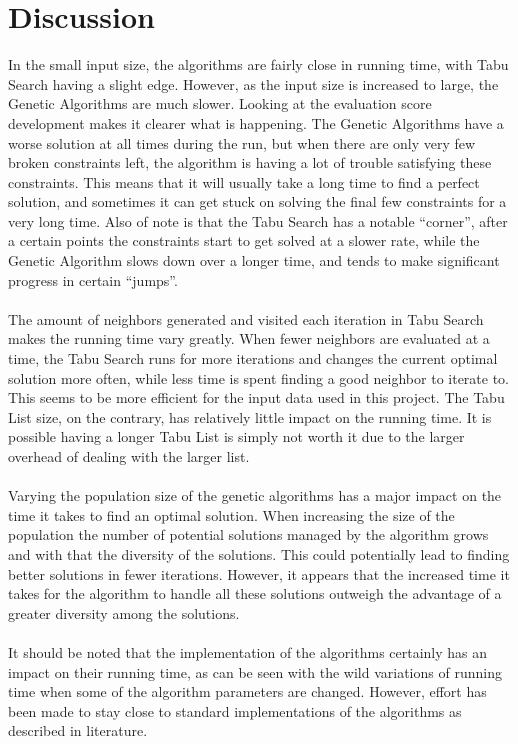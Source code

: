 \documentclass[titlepage,a4paper]{article}
\begin{document}
\pagebreak
\section{Discussion}
In the small input size, the algorithms are fairly close in running time, with Tabu Search having a slight edge. However, as the input size is increased to large, the Genetic Algorithms are much slower. Looking at the evaluation score development makes it clearer what is happening. The Genetic Algorithms have a worse solution at all times during the run, but when there are only very few broken constraints left, the algorithm is having a lot of trouble satisfying these constraints. This means that it will usually take a long time to find a perfect solution, and sometimes it can get stuck on solving the final few constraints for a very long time.
Also of note is that the Tabu Search has a notable “corner”, after a certain points the constraints start to get solved at a slower rate, while the Genetic Algorithm slows down over a longer time, and tends to make significant progress in certain “jumps”. \\\\
The amount of neighbors generated and visited each iteration in Tabu Search makes the running time vary greatly. When fewer neighbors are evaluated at a time, the Tabu Search runs for more iterations and changes the current optimal solution more often, while less time is spent finding a good neighbor to iterate to. This seems to be more efficient for the input data used in this project.
The Tabu List size, on the contrary, has relatively little impact on the running time. It is possible having a longer Tabu List is simply not worth it due to the larger overhead of dealing with the larger list. \\\\
Varying the population size of the genetic algorithms has a major impact on the time it takes to find an optimal solution. When increasing the size of the population the number of potential solutions managed by the algorithm grows and with that the diversity of the solutions. This could potentially lead to finding better solutions in fewer iterations. However, it appears that the increased time it takes for the algorithm to handle all these solutions outweigh the advantage of a greater diversity among the solutions. \\\\
It should be noted that the implementation of the algorithms certainly has an impact on their running time, as can be seen with the wild variations of running time when some of the algorithm parameters are changed. However, effort has been made to stay close to standard implementations of the algorithms as described in literature.
\end{document}
